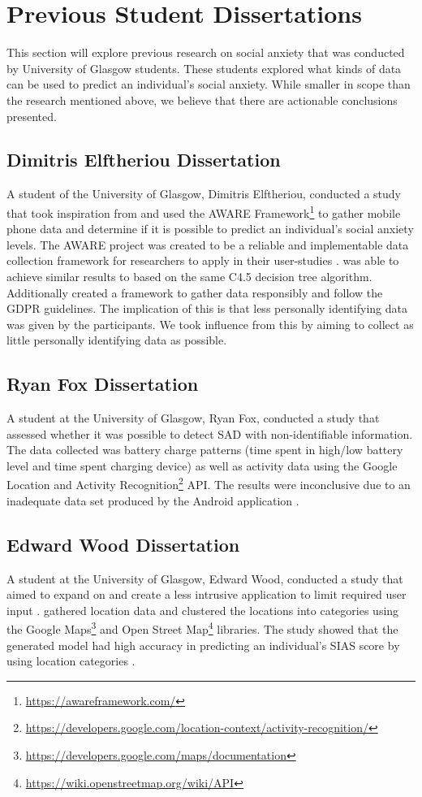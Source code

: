 \documentclass{l4proj}
\begin{document}
\section{Previous Student Dissertations}
This section will explore previous research on social anxiety that was conducted by University of Glasgow students. These students explored what kinds of data can be used to predict an individual's social anxiety. While smaller in scope than the research mentioned above, we believe that there are actionable conclusions presented.

\subsection{Dimitris Elftheriou Dissertation}
A student of the University of Glasgow, Dimitris Elftheriou, conducted a study that took inspiration from \citet{boukhechba} and used the AWARE Framework\footnote{\url{https://awareframework.com/}} to gather mobile phone data and determine if it is possible to predict an individual's social anxiety levels. The AWARE project was created to be a reliable and implementable data collection framework for researchers to apply in their user-studies \citep{aware_thesis, aware}. \citet{dimitris} was able to achieve similar results to \citet{boukhechba} based on the same C4.5 decision tree algorithm. Additionally \citet{dimitris} created a framework to gather data responsibly and follow the GDPR guidelines. The implication of this is that less personally identifying data was given by the participants. We took influence from this by aiming to collect as little personally identifying data as possible. 

\subsection{Ryan Fox Dissertation}
A student at the University of Glasgow, Ryan Fox, conducted a study that assessed whether it was possible to detect SAD with non-identifiable information. The data collected was battery charge patterns (time spent in high/low battery level and time spent charging device) as well as activity data using the Google Location and Activity Recognition\footnote{\url{https://developers.google.com/location-context/activity-recognition/}} API. The results were inconclusive due to an inadequate data set produced by the Android application \citep{fox}.


\subsection{Edward Wood Dissertation}
A student at the University of Glasgow, Edward Wood, conducted a study that aimed to expand on \citet{student_life_article, boukhechba, dimitris} and create a less intrusive application to limit required user input \citep{wood}. \cite{wood} gathered location data and clustered the locations into categories using the Google Maps\footnote{\url{https://developers.google.com/maps/documentation}} and Open Street Map\footnote{\url{https://wiki.openstreetmap.org/wiki/API}} libraries. The study showed that the generated model had high accuracy in predicting an individual's SIAS score by using location categories \citep{wood}.
\end{document}
